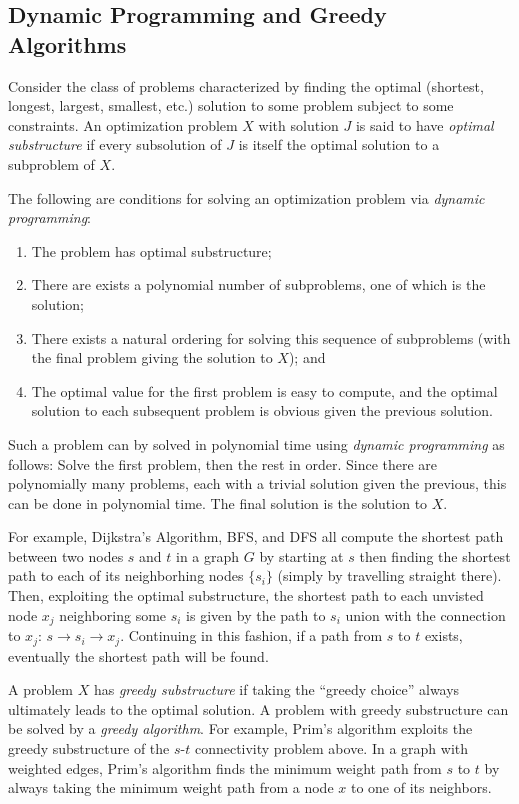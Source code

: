 \documentclass[12pt]{article}
\begin{document}
\subsection*{Dynamic Programming and Greedy Algorithms}

Consider the class of problems characterized by finding the optimal
(shortest, longest, largest, smallest, etc.)
solution to some problem subject to some constraints.
An optimization problem $X$ with solution $J$ is said to have 
{\it optimal substructure} if every subsolution of $J$ is itself 
the optimal solution to a subproblem of $X$.

The following are conditions for solving an optimization problem via 
{\it dynamic programming}:
\begin{enumerate}
\item The problem has optimal substructure;
\item There are exists a polynomial number of subproblems, one of which is
the solution;
\item There exists a natural ordering for solving this sequence of subproblems
(with the final problem giving the solution to $X$); and
\item The optimal value for the first problem is easy to compute, and the
optimal solution to each subsequent problem is obvious given the previous 
solution.
\end{enumerate}
Such a problem can by solved in polynomial time using 
{\it dynamic programming} as follows:
Solve the first problem, then the rest in order.
Since there are polynomially many problems, each with a trivial solution
given the previous, this can be done in polynomial time.
The final solution is the solution to $X$.

For example, Dijkstra's Algorithm, BFS, and DFS all
compute the shortest path between two nodes $s$ and $t$ in a graph $G$ by 
starting at $s$ then finding the shortest path to each of its neighborhing 
nodes $\{s_i\}$ (simply by travelling straight there).
Then, exploiting the optimal substructure, the shortest path to each unvisted 
node $x_j$ neighboring some $s_i$ is given by the path to $s_i$ union with 
the connection to $x_j$: $s \rightarrow s_i \rightarrow x_j$.
Continuing in this fashion, if a path from $s$ to $t$ exists, eventually 
the shortest path will be found.

A problem $X$ has {\it greedy substructure} if taking the ``greedy choice''
always ultimately leads to the optimal solution.
A problem with greedy substructure can be solved by a {\it greedy algorithm}.
For example, Prim's algorithm exploits the greedy substructure of the 
$s$-$t$ connectivity problem above.
In a graph with weighted edges, Prim's algorithm finds the minimum weight
path from $s$ to $t$ by always taking the minimum weight path from a node $x$ 
to one of its neighbors.
\end{document}

